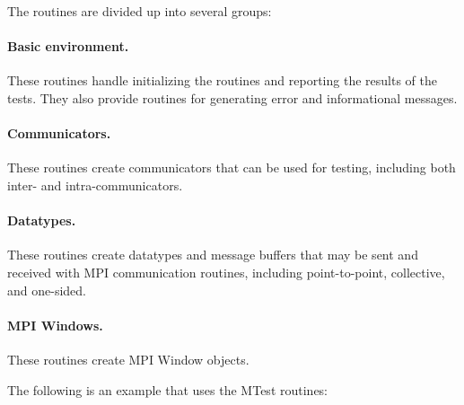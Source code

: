 The routines are divided up into several groups:
\paragraph{Basic environment.}
These routines handle initializing the routines and reporting the
results of the tests.  They also provide routines for generating error
and informational messages.  

\paragraph{Communicators.}
These routines create communicators that can be used for testing,
including both inter- and intra-communicators.

\paragraph{Datatypes.}
These routines create datatypes and message buffers that may be sent
and received with MPI communication routines, including
point-to-point, collective, and one-sided.  

\paragraph{MPI Windows.}
These routines create MPI Window objects.

The following is an example that uses the MTest routines:

